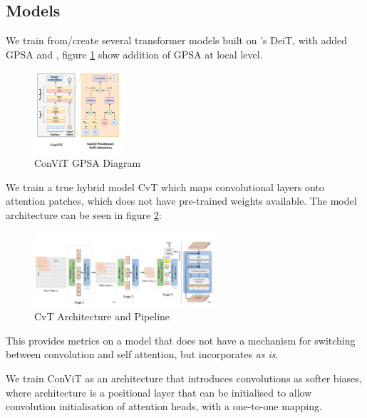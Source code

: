 
\subsection{Models}
We train from/create several transformer models built on \cite{Touvron2020a}'s DeiT, with added GPSA\cite{DAscoli2021} and \cite{Wu2021}, figure \ref{fig:ConViT model} show addition of GPSA at local level. 

\begin{figure}[ht!]
    \centering
    \includegraphics[width=0.3\textwidth]{figures/research_methadology/ConViT_model.png}
    \caption{ConViT GPSA Diagram \cite{DAscoli2021}}
    \label{fig:ConViT model}
\end{figure}

We train a true hybrid model CvT which maps convolutional layers onto attention patches, which does not have pre-trained weights available. The model architecture can be seen in figure \ref{fig:CvT}: 

\begin{figure}[ht!]
    \centering
    \includegraphics[width=0.6\textwidth]{figures/research_methadology/CViT.png}
    \caption{CvT Architecture and Pipeline \cite{Wu2021} }
    \label{fig:CvT}
\end{figure}

This provides metrics on a model that does not have a mechanism for switching between convolution and self attention, but incorporates \textit{as is}.

We train ConViT as an architecture that introduces convolutions as softer biases, where architecture is a positional layer that can be initialised to allow convolution initialisation of attention heads, with a one-to-one mapping. 



